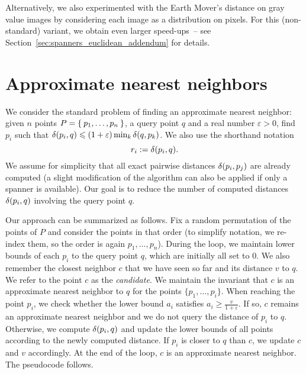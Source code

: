 \documentclass[]{ws-ijcga}
\renewcommand{\leq}{\leqslant}
\renewcommand{\geq}{\geqslant}
\newcommand{\eps}{\varepsilon}
\begin{document}
Alternatively, we also experimented with the Earth Mover’s distance on
gray value images by considering each image as a distribution on pixels.
For this (non-standard) variant, we obtain even larger speed-ups~-- see
Section~\ref{sec:spanners_euclidean_addendum} for details.


\section{Approximate nearest neighbors}
\label{sec:ann}
We consider the standard problem of finding an approximate nearest neighbor: given
$n$ points $P = \Set{p_1, \dots, p_n}$, a query point $q$ and a real number $\eps > 0$,
find $p_i$ such that $\dist(p_i, q) \leq (1 + \eps) \min_{k} \dist(q, p_k)$. We also use the shorthand notation
\[
    r_i := \delta(p_i, q).
\]
We assume for simplicity
that all exact pairwise distances $\delta(p_i, p_j)$ are already computed
(a slight modification of the algorithm can also be applied if only a spanner is available).
Our goal is to reduce the number of computed distances $\delta(p_i, q)$ involving the query point $q$.

Our approach can be summarized as follows. 
Fix a random permutation of the points of $P$ 
and consider the points in that order 
(to simplify notation,
we re-index them, so the order is again $p_1, \dots, p_n$).
During the loop, we maintain lower bounds of each $p_i$
to the query point $q$, which are initially all set to $0$.
We also remember the closest neighbor $c$ that we have seen so
far and its distance $v$ to $q$.
We refer to the point $c$ as the \emph{candidate}.
We maintain the invariant that $c$ is an approximate nearest neighbor
to $q$ for the points $\{p_1,\ldots,p_i\}$.
When reaching the point $p_i$, we check whether the lower
bound $a_i$ satisfies $a_i\geq \frac{v}{1+\eps}$.
If so, $c$ remains an approximate nearest neighbor and
we do not query the distance of $p_i$ to $q$.
Otherwise, we compute $\delta(p_i,q)$ and update the lower bounds
of all points according to the newly computed distance.
If $p_i$ is closer to $q$ than $c$, we update $c$ and $v$
accordingly. At the end of the loop, $c$ is an approximate nearest
neighbor. The pseudocode follows.


\begin{algorithmic}
\label{alg:ann_blind}

\Function{ApproximateNearestNeighbor}{$P, q, \eps$}
    \State {}
        \If {$a_i \geq \frac{v}{1+\eps}$}
        \Else
            \State {}
            \EndIf
        \EndIf
    \EndFor
    \State {}
\EndFunction
\end{algorithmic}
\end{document}
